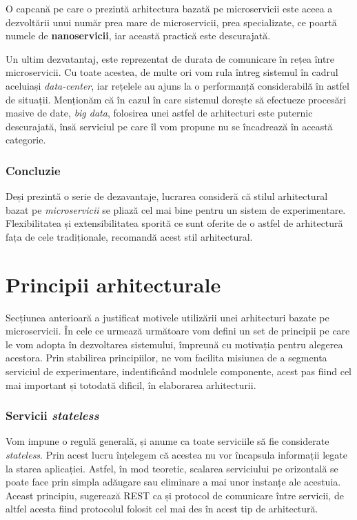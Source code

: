 \begin{remark}
	O capcană pe care o prezintă arhitectura bazată pe microservicii este aceea a dezvoltării unui număr prea mare de microservicii, prea specializate, ce poartă numele de \textbf{nanoservicii}, iar această practică este descurajată.
\end{remark}

Un ultim dezvatantaj, este reprezentat de durata de comunicare în rețea între microservicii. Cu toate acestea, de multe ori vom rula întreg sistemul în cadrul aceluiași \textit{data-center}, iar rețelele au ajuns la o performanță considerabilă în astfel de situații. Menționăm că în cazul în care sistemul dorește să efectueze procesări masive de date, \textit{big data}, folosirea unei astfel de arhitecturi este puternic descurajată, însă serviciul pe care îl vom propune nu se încadrează în această categorie.

\subsubsection{Concluzie}

Deși prezintă o serie de dezavantaje, lucrarea consideră că stilul arhitectural bazat pe \textit{microservicii} se pliază cel mai bine pentru un sistem de experimentare. Flexibilitatea și extensibilitatea sporită ce sunt oferite de o astfel de arhitectură fața de cele tradiționale, recomandă acest stil arhitectural.

\section{Principii arhitecturale}

Secțiunea anterioară a justificat motivele utilizării unei arhitecturi bazate pe microservicii. În cele ce urmează următoare vom defini un set de principii pe care le vom adopta în dezvoltarea sistemului, împreună cu motivația pentru alegerea acestora. Prin stabilirea principiilor, ne vom facilita misiunea de a segmenta serviciul de experimentare, indentificând modulele componente, acest pas fiind cel mai important și totodată dificil, în elaborarea arhitecturii.

\subsubsection{Servicii \textit{stateless}}

Vom impune o regulă generală, și anume ca toate serviciile să fie considerate \textit{stateless}. Prin acest lucru înțelegem că acestea nu vor încapsula informații legate la starea aplicației. Astfel, în mod teoretic, scalarea serviciului pe orizontală se poate face prin simpla adăugare sau eliminare a mai unor instanțe ale acestuia. Aceast principiu, sugerează REST ca și protocol de comunicare între servicii, de altfel acesta fiind protocolul folosit cel mai des în acest tip de arhitectură\cite{buildingmicro}. 

